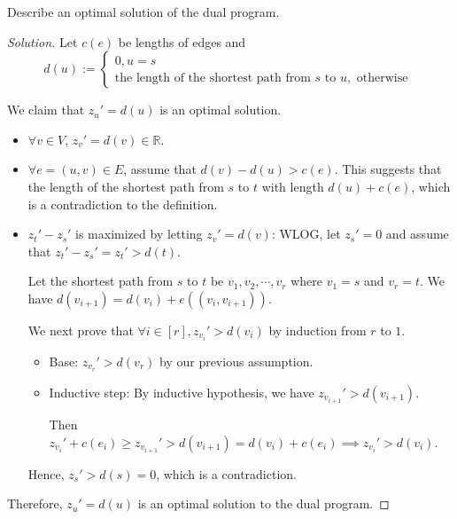 

\begin{thm}{}{}
    Describe an optimal solution of the dual program.
\end{thm}

\begin{proof}[Solution]
    Let $c(e)$ be lengths of edges and 
    $$d(u) := \begin{cases}
        0, u = s \\
        \text{the length of the shortest path from } s \text{ to } u, \text{ otherwise }
    \end{cases}$$

    We claim that $z_u' = d(u)$ is an optimal solution. 
    \begin{itemize}
        \item $\forall v \in V$, $z_v' = d(v) \in \mathbb R $.
        \item $\forall e = (u, v) \in E$, assume that $d(v) - d(u) > c(e)$. This suggests that the length of the shortest path from $s$ to $t$ with length $d(u) + c(e)$, which is a contradiction to the definition.
        \item $z_t' - z_s'$ is maximized by letting $z_v' = d(v)$:
            WLOG, let $z_s' = 0$ and assume that $z_t' - z_s' = z_t' > d(t)$.

            Let the shortest path from $s$ to $t$ be $v_1, v_2, \cdots , v_r$ where $v_1 = s$ and $v_r = t$. We have $d(v_{i+1}) = d(v_i) + e((v_i, v_{i+1}))$.

            We next prove that $\forall i \in [r], z_{v_i}' > d({v_i})$ by induction from $r$ to $1$.
            \begin{itemize}
                \item Base: $z_{v_r}' > d(v_r)$ by our previous assumption.
                \item Inductive step: By inductive hypothesis, we have $z_{v_{i+1}}' > d(v_{i+1})$.

                    Then $z_{v_i}' + c(e_i) \ge z_{v_{i+1}}' > d(v_{i+1}) = d(v_i) + c(e_i) \implies z_{v_i}' > d(v_i)$.
            \end{itemize}

            Hence, $z_s' > d(s) = 0$, which is a contradiction.
    \end{itemize}

    Therefore, $z_u' = d(u)$ is an optimal solution to the dual program.
\end{proof}

